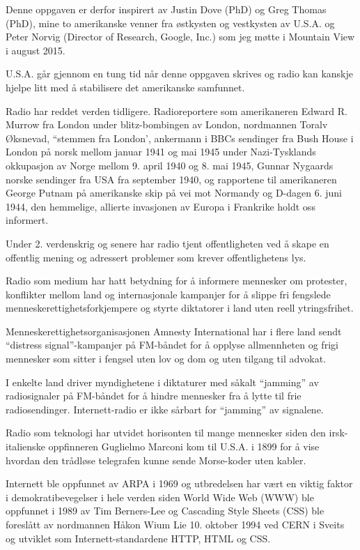 \documentclass[a4paper,norsk,utf8]{report}
\begin{document}
Denne oppgaven er derfor inspirert av Justin Dove (PhD) og Greg Thomas
(PhD), mine to amerikanske venner fra østkysten og vestkysten av U.S.A.
og Peter Norvig (Director of Research, Google, Inc.) som jeg møtte i
Mountain View i august 2015.

U.S.A. går gjennom en tung tid når denne oppgaven skrives og radio kan kanskje
hjelpe litt med å stabilisere det amerikanske samfunnet.

Radio har reddet verden tidligere.  Radioreportere som amerikaneren
Edward R. Murrow fra London under blitz-bombingen av London,
nordmannen Toralv Øksnevad, ``stemmen fra London', ankermann i BBCs
sendinger fra Bush House i London på norsk mellom januar 1941 og mai
1945 under Nazi-Tysklands okkupasjon av Norge mellom 9. april 1940 og
8. mai 1945, Gunnar Nygaards norske sendinger fra USA fra september
1940, og rapportene til amerikaneren George Putnam på amerikanske skip
på vei mot Normandy og D-dagen 6. juni 1944, den hemmelige, allierte
invasjonen av Europa i Frankrike holdt oss informert.

Under 2. verdenskrig og senere har radio tjent offentligheten ved å
skape en offentlig mening og adressert problemer som krever
offentlighetens lys.

Radio som medium har hatt betydning for å informere mennesker om protester,
konflikter mellom land og internasjonale kampanjer for å slippe fri
fengslede menneskerettighetsforkjempere og styrte diktatorer i land
uten reell ytringsfrihet.

Menneskerettighetsorganisasjonen Amnesty International har i flere
land sendt ``distress signal''-kampanjer på FM-båndet for å
opplyse allmennheten og frigi mennesker som sitter i fengsel uten lov
og dom og uten tilgang til advokat.

I enkelte land driver myndighetene i diktaturer med såkalt ``jamming''
av radiosignaler på FM-båndet for å hindre mennesker fra å lytte til
frie radiosendinger.  Internett-radio er ikke sårbart for ``jamming''
av signalene.

Radio som teknologi har utvidet horisonten til mange mennesker siden
den irsk-italienske oppfinneren Guglielmo Marconi kom til U.S.A. i 1899
for å vise hvordan den trådløse telegrafen kunne sende Morse-koder
uten kabler.

Internett ble oppfunnet av ARPA i 1969 og utbredelsen har vært en
viktig faktor i demokratibevegelser i hele verden siden World Wide Web
(WWW) ble oppfunnet i 1989 av Tim Berners-Lee og Cascading Style
Sheets (CSS) ble foreslått av nordmannen Håkon Wium Lie 10. oktober
1994 ved CERN i Sveits og utviklet som Internett-standardene HTTP,
HTML og CSS.
\end{document}
